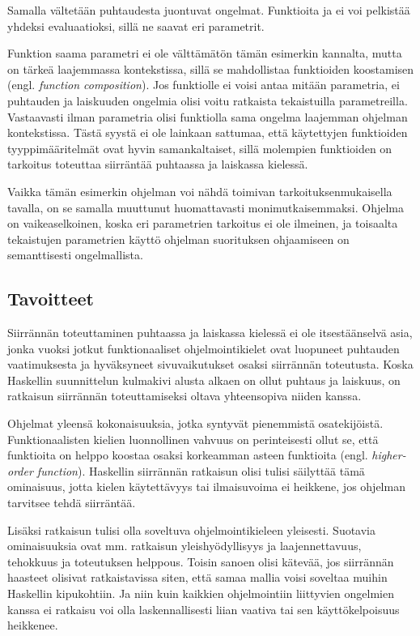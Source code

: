\documentclass[finnish]{tktltiki2}
\begin{document}
Samalla vältetään puhtaudesta juontuvat ongelmat. Funktioita  ja 
ei voi pelkistää yhdeksi evaluaatioksi, sillä ne saavat eri parametrit.

Funktion  saama parametri  ei ole välttämätön tämän esimerkin kannalta,
mutta on tärkeä laajemmassa kontekstissa, sillä se mahdollistaa funktioiden koostamisen (engl.
\emph{function composition}). Jos funktiolle  ei voisi antaa mitään parametria, ei
puhtauden ja laiskuuden ongelmia olisi voitu ratkaista tekaistuilla parametreilla. Vastaavasti ilman
parametria  olisi funktiolla  sama ongelma laajemman ohjelman
kontekstissa. Tästä syystä ei ole lainkaan sattumaa, että käytettyjen funktioiden tyyppimääritelmät
ovat hyvin samankaltaiset, sillä molempien funktioiden on tarkoitus toteuttaa siirräntää puhtaassa
ja laiskassa kielessä.

Vaikka tämän esimerkin ohjelman voi nähdä toimivan tarkoituksenmukaisella tavalla, on se samalla
muuttunut huomattavasti monimutkaisemmaksi. Ohjelma on vaikeaselkoinen, koska eri parametrien
tarkoitus ei ole ilmeinen, ja toisaalta tekaistujen parametrien käyttö ohjelman suorituksen
ohjaamiseen on semanttisesti ongelmallista.

\subsection{Tavoitteet}

Siirrännän toteuttaminen puhtaassa ja laiskassa kielessä ei ole itsestäänselvä asia, jonka vuoksi
jotkut funktionaaliset ohjelmointikielet ovat luopuneet puhtauden vaatimuksesta ja hyväksyneet
sivuvaikutukset osaksi siirrännän toteutusta. Koska Haskellin suunnittelun kulmakivi alusta alkaen
on ollut puhtaus ja laiskuus, on ratkaisun siirrännän toteuttamiseksi oltava yhteensopiva niiden
kanssa.

Ohjelmat yleensä kokonaisuuksia, jotka syntyvät pienemmistä osatekijöistä. Funktionaalisten kielien
luonnollinen vahvuus on perinteisesti ollut se, että funktioita on helppo koostaa osaksi korkeamman
asteen funktioita (engl. \emph{higher-order function}). Haskellin siirrännän ratkaisun olisi tulisi
säilyttää tämä ominaisuus, jotta kielen käytettävyys tai ilmaisuvoima ei heikkene, jos ohjelman
tarvitsee tehdä siirräntää.

Lisäksi ratkaisun tulisi olla soveltuva ohjelmointikieleen yleisesti. Suotavia ominaisuuksia ovat
mm. ratkaisun yleishyödyllisyys ja laajennettavuus, tehokkuus ja toteutuksen helppous. Toisin sanoen
olisi kätevää, jos siirrännän haasteet olisivat ratkaistavissa siten, että samaa mallia voisi
soveltaa muihin Haskellin kipukohtiin. Ja niin kuin kaikkien ohjelmointiin liittyvien ongelmien
kanssa ei ratkaisu voi olla laskennallisesti liian vaativa tai sen käyttökelpoisuus heikkenee.
\end{document}
